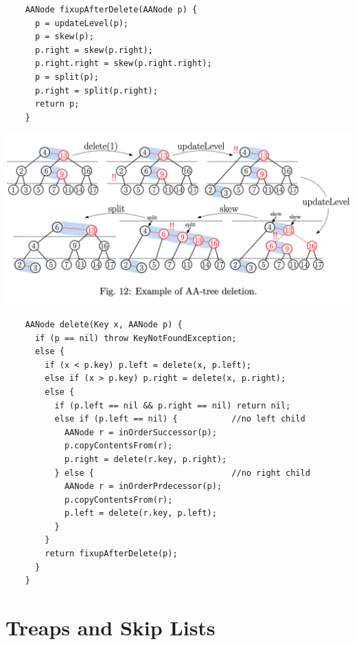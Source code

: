 \documentclass{article}
\begin{document}
  \begin{lstlisting}
    AANode fixupAfterDelete(AANode p) {
      p = updateLevel(p);
      p = skew(p);
      p.right = skew(p.right);
      p.right.right = skew(p.right.right);
      p = split(p);
      p.right = split(p.right);
      return p;
    }
  \end{lstlisting}
  \begin{center}
  \includegraphics[scale=0.2]{DeletionAATree}
  \end{center}
  \begin{lstlisting}
    AANode delete(Key x, AANode p) {
      if (p == nil) throw KeyNotFoundException;
      else {
        if (x < p.key) p.left = delete(x, p.left);
        else if (x > p.key) p.right = delete(x, p.right);
        else {
          if (p.left == nil && p.right == nil) return nil;
          else if (p.left == nil) {           //no left child
            AANode r = inOrderSuccessor(p);
            p.copyContentsFrom(r);
            p.right = delete(r.key, p.right);
          } else {                            //no right child
            AANode r = inOrderPrdecessor(p);
            p.copyContentsFrom(r);
            p.left = delete(r.key, p.left);
          }
        }
        return fixupAfterDelete(p);
      }
    }
  \end{lstlisting}
  \newpage
  \section{Treaps and Skip Lists}
\end{document}
